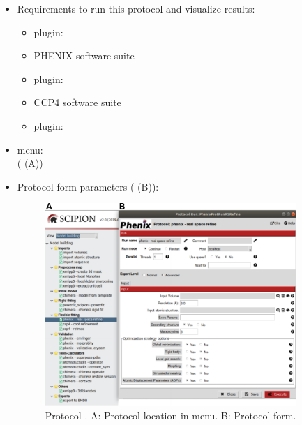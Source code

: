 \begin{itemize}
 \item Requirements to run this protocol and visualize results:
    \begin{itemize}
        \item \scipion plugin: 
        \item PHENIX software suite
        \item \scipion plugin: 
        \item CCP4 software suite
        \item \scipion plugin: 
    \end{itemize}
 \item \scipion menu:\\
   ( (A))
  
 \item Protocol form parameters ( (B)):
  
    \begin{figure}[H]
     \centering 
     \captionsetup{width=.7\linewidth} 
     \includegraphics[width=0.90\textwidth]{Images_appendix/Fig148.pdf}
     \caption{Protocol . A: Protocol location in \scipion menu. B: Protocol form.}
     \label{fig:app_protocol_real_space_refine_1}
    \end{figure}
    

\end{itemize}
